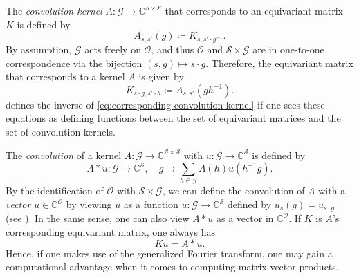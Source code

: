 \documentclass[preprint,12pt,authoryear]{elsarticle}
\newcommand{\C}{\mathbb{C}}
\newcommand\Gc{\mathcal G}
\newcommand\Oc{\mathcal O}
\newcommand\Sc{\mathcal S}
\begin{document}
{The \emph{convolution kernel} $A : \Gc \rightarrow \C^{\Sc \times \Sc}$ that corresponds to an equivariant matrix $K$ is defined by
\begin{equation}
    A_{s,s'}(g) \coloneqq K_{s,s'\cdot g^{-1}} .
    \label{eq:corresponding-convolution-kernel}
\end{equation}
By assumption, $\Gc$ acts freely on $\Oc$, and thus $\Oc$ and $\Sc \times \Gc$ are in one-to-one correspondence via the bijection $(s,g) \mapsto s \cdot g$.
Therefore, the equivariant matrix that corresponds to a kernel $A$ is given by 
\begin{equation}
    \label{eq:corresponding-equivariant-matrix}
    K_{s \cdot g, s' \cdot h} \coloneqq A_{s,s'}(g h^{-1}).
\end{equation}
 defines the inverse of \eqref{eq:corresponding-convolution-kernel} if one sees these equations as defining functions between the set of equivariant matrices and the set of convolution kernels.

The \emph{convolution} of a kernel $A : \Gc \rightarrow \C^{\Sc \times \Sc}$ with $u : \Gc \rightarrow \C^{\Sc}$ is defined by
\begin{equation}
   A * u : \Gc \rightarrow \C^\Sc, \quad g \mapsto \sum_{h \in \Gc} A(h) u(h^{-1} g). 
   \label{eq:definition-convolution}
\end{equation}
By the identification of $\Oc$ with $\Sc \times \Gc$, we can define the convolution of $A$ with a \emph{vector} $u \in \C^\Oc$ by viewing $u$ as a function $u : \Gc \rightarrow \C^\Sc$ defined by $u_s(g) = u_{s \cdot g}$ (see ). In the same sense, one can also view $A * u$ as a vector in $\C^\Oc$. %
If $K$ is $A$'s corresponding equivariant matrix, one always has
\begin{equation}
    \label{eq:matrix-multiplication-equals-convolution}
    K u = A * u.   
\end{equation}
Hence, if one makes use of the generalized Fourier transform, one may gain a computational advantage when it comes to computing matrix-vector products.

}
\end{document}
